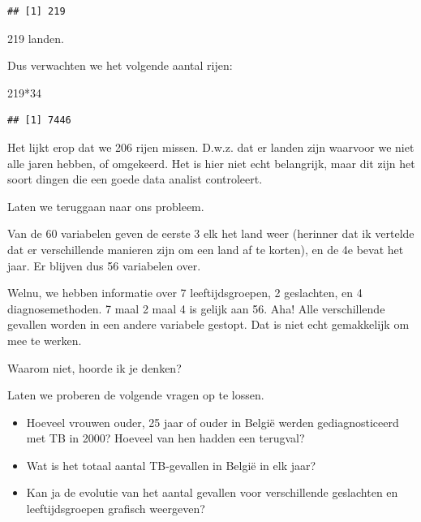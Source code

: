 \documentclass[]{tufte-book}
\newenvironment{Shaded}{}{}
\newcommand{\DecValTok}[1]{\textcolor[rgb]{0.25,0.63,0.44}{#1}}
\newcommand{\KeywordTok}[1]{\textcolor[rgb]{0.00,0.44,0.13}{\textbf{#1}}}
\newcommand{\NormalTok}[1]{#1}
\newcommand{\OperatorTok}[1]{\textcolor[rgb]{0.40,0.40,0.40}{#1}}
\newcommand{\StringTok}[1]{\textcolor[rgb]{0.25,0.44,0.63}{#1}}
\providecommand{\tightlist}{%
  \setlength{\itemsep}{0pt}\setlength{\parskip}{0pt}}
\begin{document}
\begin{Shaded}
\end{Shaded}

\begin{verbatim}
## [1] 219
\end{verbatim}

219 landen.

Dus verwachten we het volgende aantal rijen:

\begin{Shaded}
\begin{Highlighting}[]
\DecValTok{219}\OperatorTok{*}\DecValTok{34}
\end{Highlighting}
\end{Shaded}

\begin{verbatim}
## [1] 7446
\end{verbatim}

Het lijkt erop dat we 206 rijen missen. D.w.z. dat er landen zijn waarvoor we niet alle jaren hebben, of omgekeerd. Het is hier niet echt belangrijk, maar dit zijn het soort dingen die een goede data analist controleert.

Laten we teruggaan naar ons probleem.

Van de 60 variabelen geven de eerste 3 elk het land weer (herinner dat ik vertelde dat er verschillende manieren zijn om een land af te korten), en de 4e bevat het jaar. Er blijven dus 56 variabelen over.

Welnu, we hebben informatie over 7 leeftijdsgroepen, 2 geslachten, en 4 diagnosemethoden. 7 maal 2 maal 4 is gelijk aan 56. Aha! Alle verschillende gevallen worden in een andere variabele gestopt. Dat is niet echt gemakkelijk om mee te werken.

Waarom niet, hoorde ik je denken?

Laten we proberen de volgende vragen op te lossen.

\begin{itemize}
\tightlist
\item
  Hoeveel vrouwen ouder, 25 jaar of ouder in België werden gediagnosticeerd met TB in 2000? Hoeveel van hen hadden een terugval?
\item
  Wat is het totaal aantal TB-gevallen in België in elk jaar?
\item
  Kan ja de evolutie van het aantal gevallen voor verschillende geslachten en leeftijdsgroepen grafisch weergeven?
\end{itemize}
\end{document}
